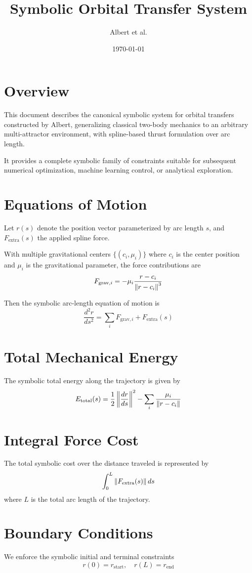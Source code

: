 \documentclass{article}
\title{Symbolic Orbital Transfer System}
\author{Albert et al.}
\date{\today}
\begin{document}
\maketitle

\section*{Overview}
This document describes the canonical symbolic system for orbital transfers constructed by Albert, generalizing classical two-body mechanics to an arbitrary multi-attractor environment, with spline-based thrust formulation over arc length.

It provides a complete symbolic family of constraints suitable for subsequent numerical optimization, machine learning control, or analytical exploration.

\section*{Equations of Motion}
Let $r(s)$ denote the position vector parameterized by arc length $s$, and $F_\text{extra}(s)$ the applied spline force. 

With multiple gravitational centers $\{(c_i, \mu_i)\}$ where $c_i$ is the center position and $\mu_i$ is the gravitational parameter, the force contributions are
\[
F_{\text{grav},i} = -\mu_i \frac{r - c_i}{\norm{r - c_i}^3}
\]

Then the symbolic arc-length equation of motion is
\[
\frac{d^2 r}{ds^2} = \sum_i F_{\text{grav},i} + F_\text{extra}(s)
\]

\section*{Total Mechanical Energy}
The symbolic total energy along the trajectory is given by
\[
E_{\text{total}}(s) = \frac12 \left\|\frac{dr}{ds}\right\|^2 - \sum_i \frac{\mu_i}{\norm{r - c_i}}
\]

\section*{Integral Force Cost}
The total symbolic cost over the distance traveled is represented by
\[
\int_0^L \norm{F_\text{extra}(s)} \, ds
\]
where $L$ is the total arc length of the trajectory.

\section*{Boundary Conditions}
We enforce the symbolic initial and terminal constraints
\[
r(0) = r_{\text{start}}, \quad r(L) = r_{\text{end}}
\]
\end{document}
